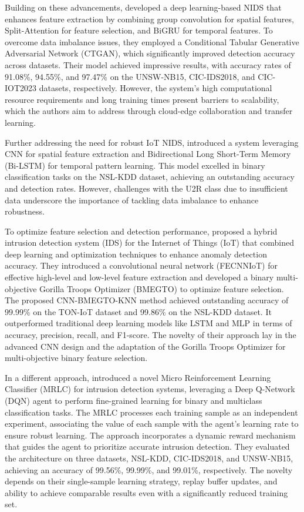 Building on these advancements, \citet{wang2024network} developed a deep learning-based NIDS that enhances feature extraction by combining group convolution for spatial features, Split-Attention for feature selection, and BiGRU for temporal features. To overcome data imbalance issues, they employed a Conditional Tabular Generative Adversarial Network (CTGAN), which significantly improved detection accuracy across datasets. Their model achieved impressive results, with accuracy rates of 91.08\%, 94.55\%, and 97.47\% on the UNSW-NB15, CIC-IDS2018, and CIC-IOT2023 datasets, respectively. However, the system's high computational resource requirements and long training times present barriers to scalability, which the authors aim to address through cloud-edge collaboration and transfer learning.

Further addressing the need for robust IoT NIDS, \citet{mynuddin2024automatic} introduced a system leveraging CNN for spatial feature extraction and Bidirectional Long Short-Term Memory (Bi-LSTM) for temporal pattern learning. This model excelled in binary classification tasks on the NSL-KDD dataset, achieving an outstanding accuracy and detection rates. However, challenges with the U2R class due to insufficient data underscore the importance of tackling data imbalance to enhance robustness.

To optimize feature selection and detection performance, \citet{asgharzadeh2024intrusion} proposed a hybrid intrusion detection system (IDS) for the Internet of Things (IoT) that combined deep learning and optimization techniques to enhance anomaly detection accuracy. They introduced a convolutional neural network (FECNNIoT) for effective high-level and low-level feature extraction and developed a binary multi-objective Gorilla Troops Optimizer (BMEGTO) to optimize feature selection. The proposed CNN-BMEGTO-KNN method achieved outstanding accuracy of 99.99\% on the TON-IoT dataset and 99.86\% on the NSL-KDD dataset. It outperformed traditional deep learning models like LSTM and MLP in terms of accuracy, precision, recall, and F1-score. The novelty of their approach lay in the advanced CNN design and the adaptation of the Gorilla Troops Optimizer for multi-objective binary feature selection.

In a different approach, \citet{darabi2024micro} introduced a novel Micro Reinforcement Learning Classifier (MRLC) for intrusion detection systems, leveraging a Deep Q-Network (DQN) agent to perform fine-grained learning for binary and multiclass classification tasks. The MRLC processes each training sample as an independent experiment, associating the value of each sample with the agent's learning rate to ensure robust learning. The approach incorporates a dynamic reward mechanism that guides the agent to prioritize accurate intrusion detection. They evaluated the architecture on three datasets, NSL-KDD, CIC-IDS2018, and UNSW-NB15, achieving an accuracy of 99.56\%, 99.99\%, and 99.01\%, respectively. The novelty depends on their single-sample learning strategy, replay buffer updates, and ability to achieve comparable results even with a significantly reduced training set.

